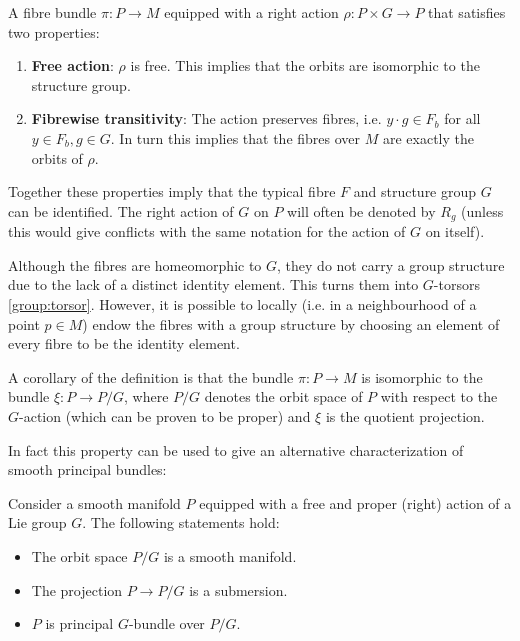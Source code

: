     \begin{definition}
        A fibre bundle $\pi:P\rightarrow M$ equipped with a right action $\rho:P\times G\rightarrow P$ that satisfies two properties:
        \begin{enumerate}
            \item\textbf{Free action}: $\rho$ is free. This implies that the orbits are isomorphic to the structure group.
            \item\textbf{Fibrewise transitivity}: The action preserves fibres, i.e. $y\cdot g\in F_b$ for all $y\in F_b, g\in G$. In turn this implies that the fibres over $M$ are exactly the orbits of $\rho$.
        \end{enumerate}
        Together these properties imply that the typical fibre $F$ and structure group $G$ can be identified. The right action of $G$ on $P$ will often be denoted by $R_g$ (unless this would give conflicts with the same notation for the action of $G$ on itself).
    \end{definition}
    \begin{remark}[$G$-torsor]\label{bundle:fibre_torsor}
        Although the fibres are homeomorphic to $G$, they do not carry a group structure due to the lack of a distinct identity element. This turns them into $G$-torsors \ref{group:torsor}. However, it is possible to locally (i.e. in a neighbourhood of a point $p\in M$) endow the fibres with a group structure by choosing an element of every fibre to be the identity element.
    \end{remark}
    \begin{property}
        A corollary of the definition is that the bundle $\pi:P\rightarrow M$ is isomorphic to the bundle $\xi:P\rightarrow P/G$, where $P/G$ denotes the orbit space of $P$ with respect to the $G$-action (which can be proven to be proper) and $\xi$ is the quotient projection.
    \end{property}
    In fact this property can be used to give an alternative characterization of smooth principal bundles:
    \begin{property}\label{bundle:quotient_manifold_theorem}
        Consider a smooth manifold $P$ equipped with a free and proper (right) action of a Lie group $G$. The following statements hold:
        \begin{itemize}
            \item The orbit space $P/G$ is a smooth manifold.
            \item The projection $P\rightarrow P/G$ is a submersion.
            \item $P$ is principal $G$-bundle over $P/G$.
        \end{itemize}
    \end{property}

